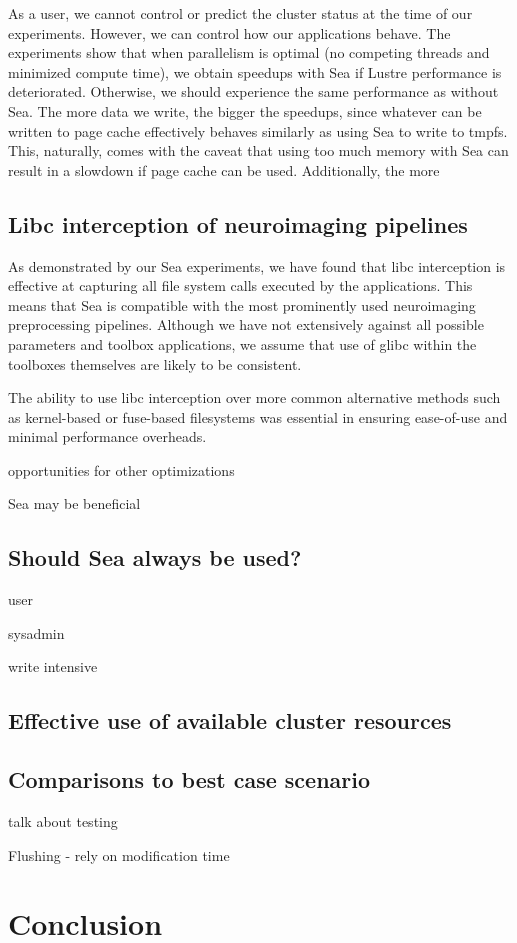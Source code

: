     As a user, we cannot control or predict the cluster status at the time of
    our experiments. However, we can control how our applications behave. The
    experiments show that when parallelism is optimal (no competing threads and
    minimized compute time), we obtain speedups with Sea if Lustre performance
    is deteriorated. Otherwise, we should experience the same performance as 
    without Sea. The more data we write, the bigger the speedups, since whatever
    can be written to page cache effectively behaves similarly as using Sea to write
    to tmpfs. This, naturally, comes with the caveat that using too much memory with
    Sea can result in a slowdown if page cache can be used. Additionally, the more  

    
    \subsection{Libc interception of neuroimaging pipelines}
    
    As demonstrated by our Sea experiments, we have found that libc interception is effective at capturing all file system
    calls executed by the applications. This means that Sea is compatible with the most prominently used neuroimaging
    preprocessing pipelines. Although we have not extensively against all possible parameters and toolbox applications, we
    assume that use of glibc within the toolboxes themselves are likely to be consistent.
    
    The ability to use libc interception over more common alternative methods such as kernel-based or fuse-based filesystems
    was essential in ensuring ease-of-use and minimal performance overheads. 
    
    opportunities for other optimizations
    
    Sea may be beneficial
    \subsection{Should Sea always be used?}
    
    user
    
    sysadmin
    
    write intensive
    
    
    
    \subsection{Effective use of available cluster resources}
    \subsection{Comparisons to best case scenario}
    
    talk about testing
    
    
    Flushing - rely on modification time
    \section{Conclusion}